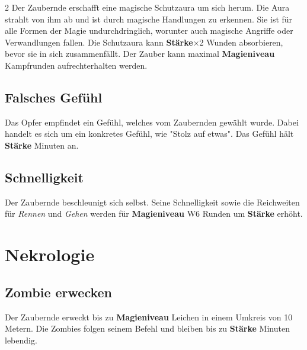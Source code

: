 \begin{multicols*}{2}
Der Zaubernde erschafft eine magische Schutzaura um sich herum. Die Aura strahlt von ihm ab und ist durch magische Handlungen zu erkennen. Sie ist für alle Formen der Magie undurchdringlich, worunter auch magische Angriffe oder Verwandlungen fallen. Die Schutzaura kann \textbf{Stärke}×2 Wunden absorbieren, bevor sie in sich zusammenfällt. Der Zauber kann maximal \textbf{Magieniveau} Kampfrunden aufrechterhalten werden.



\subsection{Falsches Gefühl}

Das Opfer empfindet ein Gefühl, welches vom Zaubernden gewählt wurde. Dabei handelt es sich um ein konkretes Gefühl, wie "Stolz auf etwas". Das Gefühl hält \textbf{Stärke} Minuten an.



\subsection{Schnelligkeit}

Der Zaubernde beschleunigt sich selbst. Seine Schnelligkeit sowie die Reichweiten für \textit{Rennen} und \textit{Gehen} werden für \textbf{Magieniveau} W6 Runden um \textbf{Stärke} erhöht.



\section{Nekrologie}

\subsection{Zombie erwecken}

Der Zaubernde erweckt bis zu \textbf{Magieniveau} Leichen in einem Umkreis von 10 Metern. Die Zombies folgen seinem Befehl und bleiben bis zu \textbf{Stärke} Minuten lebendig.


\end{multicols*}
